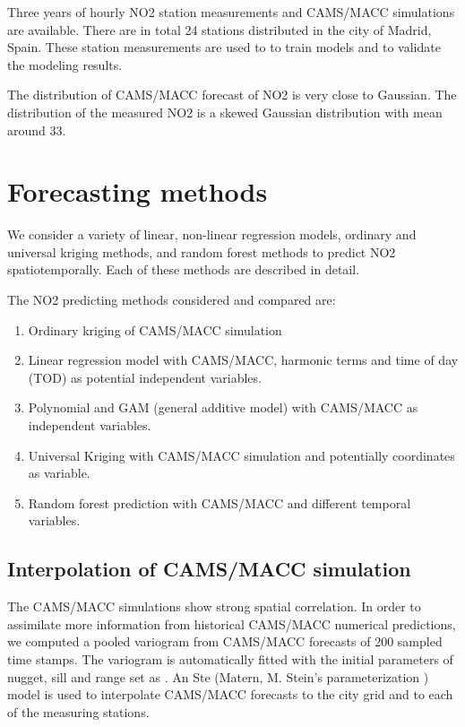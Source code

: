 \documentclass{article}
\begin{document}
Three years of hourly NO2 station measurements and CAMS/MACC
simulations are available. There are in total 24 stations distributed
in the city of Madrid, Spain. These station measurements are used to
to train models and to validate the modeling results.  

The distribution of CAMS/MACC forecast of NO2 is very close to
Gaussian. The distribution of the measured NO2 is a skewed Gaussian
distribution with mean around 33.


\section{Forecasting methods}

We consider a variety of linear, non-linear regression models,
ordinary and universal kriging methods, and random forest methods to
predict NO2 spatiotemporally. Each of these methods are described in
detail.

The NO2 predicting methods considered and compared are:
\begin{enumerate}
    \item Ordinary kriging of CAMS/MACC simulation
    \item Linear regression model with CAMS/MACC, harmonic terms and
      time of day (TOD) as potential independent variables.
    \item Polynomial and GAM (general additive model) with CAMS/MACC
      as independent variables.
    \item Universal Kriging with CAMS/MACC simulation and potentially
      coordinates as variable.
    \item Random forest prediction with CAMS/MACC and different
      temporal variables.
\end{enumerate}

\subsection{Interpolation of CAMS/MACC simulation  } 
The CAMS/MACC simulations show strong spatial correlation. In order to
assimilate more information from historical CAMS/MACC numerical
predictions, we computed a pooled variogram from CAMS/MACC forecasts
of 200 sampled time stamps. The variogram is automatically fitted with
the initial parameters of nugget, sill and range set as
\citet{automap}. An Ste (Matern, M. Stein’s parameterization ) model is used to interpolate CAMS/MACC
forecasts to the city grid and to each of the measuring stations.
\end{document}
